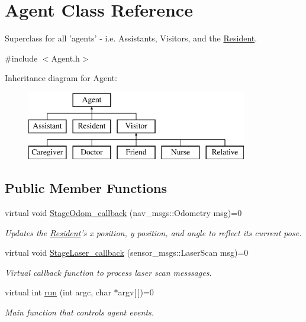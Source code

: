 \hypertarget{classAgent}{\section{Agent Class Reference}
\label{classAgent}
}


Superclass for all 'agents' -\/ i.\-e. Assistants, Visitors, and the \hyperlink{classResident}{Resident}.  




{\ttfamily \#include $<$Agent.\-h$>$}

Inheritance diagram for Agent\-:\begin{figure}[H]
\begin{center}
\leavevmode
\includegraphics[height=3.000000cm]{classAgent}
\end{center}
\end{figure}
\subsection*{Public Member Functions}
\begin{DoxyCompactItemize}
\item 
virtual void \hyperlink{classAgent_a4b1182b9ee5dccaa871d71beef94a7d2}{Stage\-Odom\-\_\-callback} (nav\-\_\-msgs\-::\-Odometry msg)=0
\begin{DoxyCompactList}\small\item\em Updates the \hyperlink{classResident}{Resident}'s x position, y position, and angle to reflect its current pose. \end{DoxyCompactList}\item 
virtual void \hyperlink{classAgent_adfe1de8bbeaa7e4a5f7f2ff3e45593e8}{Stage\-Laser\-\_\-callback} (sensor\-\_\-msgs\-::\-Laser\-Scan msg)=0
\begin{DoxyCompactList}\small\item\em Virtual callback function to process laser scan messsages. \end{DoxyCompactList}\item 
\hypertarget{classAgent_a3de32bf3de5baf5a996b874f2ba7cf75}{virtual int \hyperlink{classAgent_a3de32bf3de5baf5a996b874f2ba7cf75}{run} (int argc, char $\ast$argv\mbox{[}$\,$\mbox{]})=0}\label{classAgent_a3de32bf3de5baf5a996b874f2ba7cf75}

\begin{DoxyCompactList}\small\item\em Main function that controls agent events. \end{DoxyCompactList}\end{DoxyCompactItemize}
